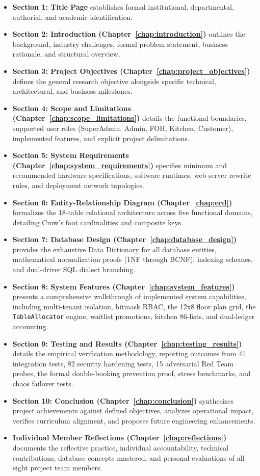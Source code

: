 \begin{itemize}
    \item \textbf{Section 1: Title Page} establishes formal institutional, departmental, authorial, and academic identification.
    \item \textbf{Section 2: Introduction (Chapter~\ref{chap:introduction})} outlines the background, industry challenges, formal problem statement, business rationale, and structural overview.
    \item \textbf{Section 3: Project Objectives (Chapter~\ref{chap:project_objectives})} defines the general research objective alongside specific technical, architectural, and business milestones.
    \item \textbf{Section 4: Scope and Limitations (Chapter~\ref{chap:scope_limitations})} details the functional boundaries, supported user roles (SuperAdmin, Admin, FOH, Kitchen, Customer), implemented features, and explicit project delimitations.
    \item \textbf{Section 5: System Requirements (Chapter~\ref{chap:system_requirements})} specifies minimum and recommended hardware specifications, software runtimes, web server rewrite rules, and deployment network topologies.
    \item \textbf{Section 6: Entity-Relationship Diagram (Chapter~\ref{chap:erd})} formalizes the 18-table relational architecture across five functional domains, detailing Crow's foot cardinalities and composite keys.
    \item \textbf{Section 7: Database Design (Chapter~\ref{chap:database_design})} provides the exhaustive Data Dictionary for all database entities, mathematical normalization proofs (1NF through BCNF), indexing schemes, and dual-driver SQL dialect branching.
    \item \textbf{Section 8: System Features (Chapter~\ref{chap:system_features})} presents a comprehensive walkthrough of implemented system capabilities, including multi-tenant isolation, bitmask RBAC, the 12x8 floor plan grid, the \texttt{TableAllocator} engine, waitlist promotions, kitchen 86-lists, and dual-ledger accounting.
    \item \textbf{Section 9: Testing and Results (Chapter~\ref{chap:testing_results})} details the empirical verification methodology, reporting outcomes from 41 integration tests, 82 security hardening tests, 15 adversarial Red Team probes, the formal double-booking prevention proof, stress benchmarks, and chaos failover tests.
    \item \textbf{Section 10: Conclusion (Chapter~\ref{chap:conclusion})} synthesizes project achievements against defined objectives, analyzes operational impact, verifies curriculum alignment, and proposes future engineering enhancements.
    \item \textbf{Individual Member Reflections (Chapter~\ref{chap:reflections})} documents the reflective practice, individual accountability, technical contributions, database concepts mastered, and personal evaluations of all eight project team members.
\end{itemize}
